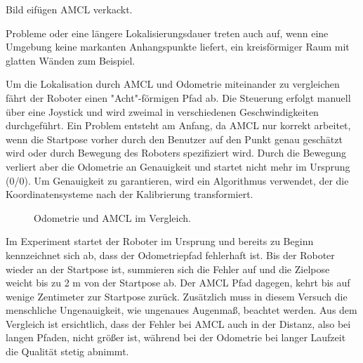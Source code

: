 \documentclass[11pt,a4paper]{article}
\begin{document}
{Bild eifügen AMCL verkackt.

Probleme oder eine l\"angere Lokalisierungsdauer treten auch auf, wenn eine Umgebung keine markanten Anhangspunkte liefert, ein kreisf\"ormiger Raum mit glatten W\"anden zum Beispiel. 

Um die Lokalisation durch AMCL und Odometrie miteinander zu vergleichen f\"ahrt der Roboter einen "Acht"-f\"ormigen Pfad ab. Die Steuerung erfolgt manuell \"uber eine Joystick und wird zweimal in verschiedenen Geschwindigkeiten durchgef\"uhrt. Ein Problem entsteht am Anfang, da AMCL nur korrekt arbeitet, wenn die Startpose vorher durch den Benutzer auf den Punkt genau gesch\"atzt wird oder durch Bewegung des Roboters spezifiziert wird. Durch die Bewegung verliert aber die Odometrie an Genauigkeit und startet nicht mehr im Ursprung (0/0). Um Genauigkeit zu garantieren, wird ein Algorithmus verwendet, der die Koordinatensysteme nach der Kalibrierung transformiert.

\begin{figure}[h]
	\centering
	\par\medskip
	\caption{ Odometrie und AMCL im Vergleich. }
\end{figure}




Im Experiment startet der Roboter im Ursprung und bereits zu Beginn kennzeichnet sich ab, dass der Odometriepfad fehlerhaft ist. Bis der Roboter wieder an der Startpose ist, summieren sich die Fehler auf und die Zielpose weicht bis zu 2 m von der Startpose ab. Der AMCL Pfad dagegen, kehrt bis auf wenige Zentimeter zur Startpose zur\"uck. Zus\"atzlich muss in diesem Versuch die menschliche Ungenauigkeit, wie ungenaues Augenma{\ss}, beachtet werden. Aus dem Vergleich ist ersichtlich, dass der Fehler bei AMCL auch in der Distanz, also bei langen Pfaden, nicht gr\"o{\ss}er ist, w\"ahrend bei der Odometrie bei langer Laufzeit die Qualit\"at stetig abnimmt.


}
\end{document}
